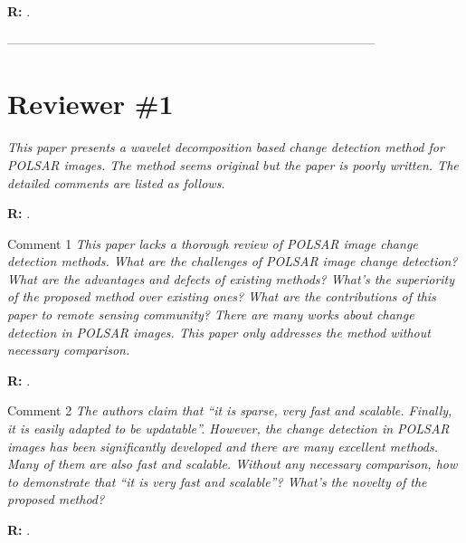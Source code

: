 \documentclass[11pt]{report}
\begin{document}
\medskip

\textbf{R:} .

\medskip


\newpage

\vspace{0.25cm}

\noindent---------------------------------------------------------------------------------------
\section*{Reviewer \#1}

\textit{This paper presents a wavelet decomposition based change detection method for POLSAR images. The method seems original but the paper is poorly written. The detailed comments are listed as follows.}

\medskip

\textbf{R:} .

\medskip


\medskip
\begin{mybox}{Comment 1}
\textit{This paper lacks a thorough review of POLSAR image change detection methods. What are the challenges of
POLSAR image change detection? What are the advantages and defects of existing methods? What’s the superiority of
the proposed method over existing ones? What are the contributions of this paper to remote sensing community? There
are many works about change detection in POLSAR images. This paper only addresses the method without necessary
comparison.}

\medskip

\textbf{R:} .


\medskip




\end{mybox}

\vspace{0.3cm}





\medskip
\begin{mybox}{Comment 2}
\textit{The authors claim that “it is sparse, very fast and scalable. Finally, it is easily adapted to be updatable”. However, the
change detection in POLSAR images has been significantly developed and there are many excellent methods. Many of
them are also fast and scalable. Without any necessary comparison, how to demonstrate that “it is very fast and scalable”? What’s the novelty of the proposed method?}

\medskip

\textbf{R:} .

\medskip

\end{mybox}
\end{document}
